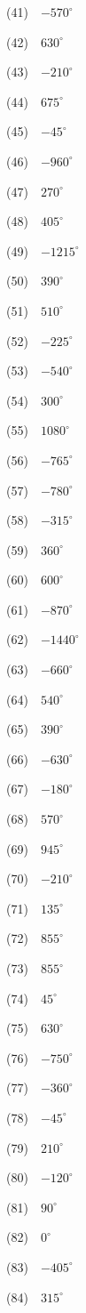 \documentclass[a4j,twocolumn,10pt,fleqn,dvipdfmx]{jarticle}
\begin{document}
(41)~~$-570^\circ$

(42)~~$630^\circ$

(43)~~$-210^\circ$

(44)~~$675^\circ$

(45)~~$-45^\circ$

(46)~~$-960^\circ$

(47)~~$270^\circ$

(48)~~$405^\circ$

(49)~~$-1215^\circ$

(50)~~$390^\circ$

(51)~~$510^\circ$

(52)~~$-225^\circ$

(53)~~$-540^\circ$

(54)~~$300^\circ$

(55)~~$1080^\circ$

(56)~~$-765^\circ$

(57)~~$-780^\circ$

(58)~~$-315^\circ$

(59)~~$360^\circ$

(60)~~$600^\circ$

(61)~~$-870^\circ$

(62)~~$-1440^\circ$

(63)~~$-660^\circ$

(64)~~$540^\circ$

(65)~~$390^\circ$

(66)~~$-630^\circ$

(67)~~$-180^\circ$

(68)~~$570^\circ$

(69)~~$945^\circ$

(70)~~$-210^\circ$

(71)~~$135^\circ$

(72)~~$855^\circ$

(73)~~$855^\circ$

(74)~~$45^\circ$

(75)~~$630^\circ$

(76)~~$-750^\circ$

(77)~~$-360^\circ$

(78)~~$-45^\circ$

(79)~~$210^\circ$

(80)~~$-120^\circ$

(81)~~$90^\circ$

(82)~~$0^\circ$

(83)~~$-405^\circ$

(84)~~$315^\circ$
\end{document}
